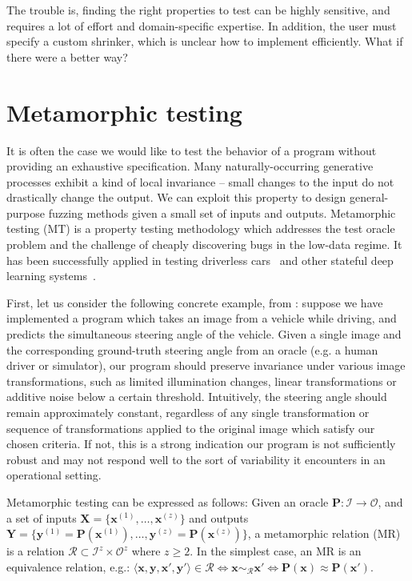 \documentclass[12pt,initial,twoside,maitrise]{dms}
\numberwithin{equation}{section}
\numberwithin{table}{chapter}
\numberwithin{figure}{chapter}
\begin{document}
The trouble is, finding the right properties to test can be highly sensitive, and requires a lot of effort and domain-specific expertise. In addition, the user must specify a custom shrinker, which is unclear how to implement efficiently. What if there were a better way?

\section{Metamorphic testing}\label{subsec:metamorphic-testing}

It is often the case we would like to test the behavior of a program without providing an exhaustive specification. Many naturally-occurring generative processes exhibit a kind of local invariance -- small changes to the input do not drastically change the output. We can exploit this property to design general-purpose fuzzing methods given a small set of inputs and outputs. Metamorphic testing (MT) is a property testing methodology which addresses the test oracle problem and the challenge of cheaply discovering bugs in the low-data regime. It has been successfully applied in testing driverless cars~\citep{zhou2019metamorphic, pei2017deepxplore, tian2018deeptest} and other stateful deep learning systems~\citep{du2018deepcruiser}.

First, let us consider the following concrete example, from \citet{tian2018deeptest}: suppose we have implemented a program which takes an image from a vehicle while driving, and predicts the simultaneous steering angle of the vehicle. Given a single image and the corresponding ground-truth steering angle from an oracle (e.g. a human driver or simulator), our program should preserve invariance under various image transformations, such as limited illumination changes, linear transformations or additive noise below a certain threshold. Intuitively, the steering angle should remain approximately constant, regardless of any single transformation or sequence of transformations applied to the original image which satisfy our chosen criteria. If not, this is a strong indication our program is not sufficiently robust and may not respond well to the sort of variability it encounters in an operational setting.

Metamorphic testing can be expressed as follows: Given an oracle $\mathbf P: \mathcal I \rightarrow \mathcal O$, and a set of inputs $\mathbf X = \{\mathbf{x}^{(1)}, \dots, \mathbf{x}^{(z)}\}$ and outputs $\mathbf Y = \{\mathbf{y}^{(1)} = \mathbf{P}(\mathbf{x}^{(1)}), \dots, \mathbf{y}^{(z)} = \mathbf{P}(\mathbf{x}^{(z)})\}$, a metamorphic relation (MR) is a relation $\mathcal R \subset \mathcal I^z \times \mathcal O^z$ where $z \geq 2$. In the simplest case, an MR is an equivalence relation, e.g.: $\langle \mathbf x, \mathbf y, \mathbf x', \mathbf y' \rangle \in \mathcal R \Leftrightarrow \mathbf x \sim_{\mathcal R} \mathbf x' \Leftrightarrow \mathbf P(\mathbf x) \approx \mathbf P(\mathbf x')$.
\end{document}
